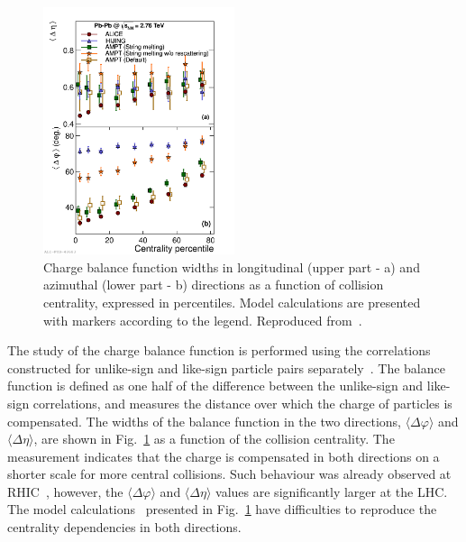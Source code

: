 \begin{figure}[!ht]
\centering
\includegraphics[width=0.5\textwidth]{ksfigures/BalanceFunctionWidth.pdf}
\caption{Charge balance function widths in longitudinal (upper part - a) and azimuthal (lower part - b) directions as a function of collision centrality, expressed in percentiles. Model calculations are presented with markers according to the legend. Reproduced from~\cite{Abelev:2013csa}.}
\label{figks:Balance}
\end{figure}

The study of the charge balance function is performed using the correlations constructed for unlike-sign and like-sign particle pairs separately~\cite{Abelev:2013csa}. The balance function is defined as one half of the difference between the unlike-sign and like-sign correlations, and measures the distance over which the charge of particles is compensated. The widths of the balance function in the two directions, $\langle \Delta\varphi \rangle$ and $\langle \Delta\eta \rangle$, are shown in Fig.~\ref{figks:Balance} as a function of the collision centrality. The measurement indicates that the charge is compensated in both directions on a shorter scale for more central collisions. Such behaviour was already observed at RHIC~\cite{Aggarwal:2010ya}, however, the $\langle \Delta\varphi \rangle$ and $\langle \Delta\eta \rangle$ values are significantly larger at the LHC. The model calculations~\cite{Wang:1991hta,Lin:2004en} presented in Fig.~\ref{figks:Balance} have difficulties to reproduce the centrality dependencies in both directions.


